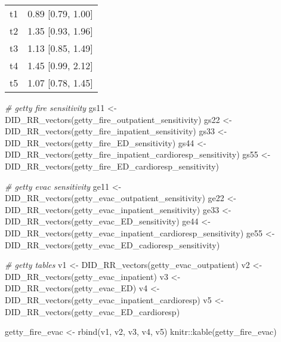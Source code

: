 \documentclass[
]{article}
\newenvironment{Shaded}{\begin{snugshade}}{\end{snugshade}}
\newcommand{\CommentTok}[1]{\textcolor[rgb]{0.56,0.35,0.01}{\textit{#1}}}
\newcommand{\FunctionTok}[1]{\textcolor[rgb]{0.00,0.00,0.00}{#1}}
\newcommand{\NormalTok}[1]{#1}
\newcommand{\OtherTok}[1]{\textcolor[rgb]{0.56,0.35,0.01}{#1}}
\newcommand{\SpecialCharTok}[1]{\textcolor[rgb]{0.00,0.00,0.00}{#1}}
\begin{document}
\begin{longtable}[]{@{}ll@{}}
\toprule()
\endhead
t1 & 0.89 {[}0.79, 1.00{]} \\
t2 & 1.35 {[}0.93, 1.96{]} \\
t3 & 1.13 {[}0.85, 1.49{]} \\
t4 & 1.45 {[}0.99, 2.12{]} \\
t5 & 1.07 {[}0.78, 1.45{]} \\
\bottomrule()
\end{longtable}

\begin{Shaded}
\begin{Highlighting}[]
\CommentTok{\# getty fire sensitivity}
\NormalTok{gs11 }\OtherTok{\textless{}{-}} \FunctionTok{DID\_RR\_vectors}\NormalTok{(getty\_fire\_outpatient\_sensitivity)}
\NormalTok{gs22 }\OtherTok{\textless{}{-}} \FunctionTok{DID\_RR\_vectors}\NormalTok{(getty\_fire\_inpatient\_sensitivity)}
\NormalTok{gs33 }\OtherTok{\textless{}{-}} \FunctionTok{DID\_RR\_vectors}\NormalTok{(getty\_fire\_ED\_sensitivity)}
\NormalTok{gs44 }\OtherTok{\textless{}{-}} \FunctionTok{DID\_RR\_vectors}\NormalTok{(getty\_fire\_inpatient\_cardioresp\_sensitivity)}
\NormalTok{gs55 }\OtherTok{\textless{}{-}} \FunctionTok{DID\_RR\_vectors}\NormalTok{(getty\_fire\_ED\_cardioresp\_sensitivity)}

\CommentTok{\# getty evac sensitivity}
\NormalTok{ge11 }\OtherTok{\textless{}{-}} \FunctionTok{DID\_RR\_vectors}\NormalTok{(getty\_evac\_outpatient\_sensitivity)}
\NormalTok{ge22 }\OtherTok{\textless{}{-}} \FunctionTok{DID\_RR\_vectors}\NormalTok{(getty\_evac\_inpatient\_sensitivity)}
\NormalTok{ge33 }\OtherTok{\textless{}{-}} \FunctionTok{DID\_RR\_vectors}\NormalTok{(getty\_evac\_ED\_sensitivity)}
\NormalTok{ge44 }\OtherTok{\textless{}{-}} \FunctionTok{DID\_RR\_vectors}\NormalTok{(getty\_evac\_inpatient\_cardioresp\_sensitivity)}
\NormalTok{ge55 }\OtherTok{\textless{}{-}} \FunctionTok{DID\_RR\_vectors}\NormalTok{(getty\_evac\_ED\_cadioresp\_sensitivity)}


\CommentTok{\# getty tables}
\NormalTok{v1 }\OtherTok{\textless{}{-}} \FunctionTok{DID\_RR\_vectors}\NormalTok{(getty\_evac\_outpatient)}
\NormalTok{v2 }\OtherTok{\textless{}{-}} \FunctionTok{DID\_RR\_vectors}\NormalTok{(getty\_evac\_inpatient)}
\NormalTok{v3 }\OtherTok{\textless{}{-}} \FunctionTok{DID\_RR\_vectors}\NormalTok{(getty\_evac\_ED)}
\NormalTok{v4 }\OtherTok{\textless{}{-}} \FunctionTok{DID\_RR\_vectors}\NormalTok{(getty\_evac\_inpatient\_cardioresp)}
\NormalTok{v5 }\OtherTok{\textless{}{-}} \FunctionTok{DID\_RR\_vectors}\NormalTok{(getty\_evac\_ED\_cardioresp)}

\NormalTok{getty\_fire\_evac }\OtherTok{\textless{}{-}} \FunctionTok{rbind}\NormalTok{(v1, v2, v3, v4, v5)}
\NormalTok{knitr}\SpecialCharTok{::}\FunctionTok{kable}\NormalTok{(getty\_fire\_evac)}
\end{Highlighting}
\end{Shaded}
\end{document}

